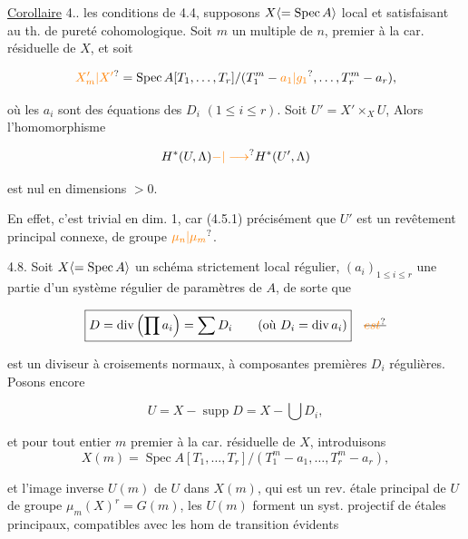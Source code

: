 
\uline{Corollaire} 4..  les conditions de 4.4, supposons $X\inserted{=\operatorname{Spec} A}$  local et satisfaisant au th. de pureté cohomologique. Soit $m$ un  multiple de $n$, premier à la car. résiduelle de $X$, et soit

\[
\unsure{X'_m|X'}=\operatorname{Spec} A[T_1,\ldots,T_r]/(T_1^m-\unsure{a_1|g_1},\ldots,T_r^m-a_r),
\]

où  les $a_i$ sont des équations  des $D_i$ $(1\leq i\leq r)$. Soit $U'=X'\times_X U$, Alors l'homomorphisme 

\[
H^*(U,\Lambda)\unsure{{-}|\longrightarrow}H^*(U',\Lambda)
\]

est nul en dimensions $>0$.

En effet, c'est trivial en dim. 1, car (4.5.1)  précisément   que $U'$ est un revêtement  principal connexe, de groupe $\unsure{\mu_n|\mu_m}$.


4.8. Soit $X\inserted{=\operatorname{Spec} A}$ un schéma strictement local régulier, $(a_i)_{1\leq i\leq r}$ une partie d'un système régulier de paramètres de $A$, de sorte que  

\[
\boxed{D=\operatorname{div}\left(\prod a_i\right)=\sum D_i\qquad (\text{où }D_i=\operatorname{div}a_i)}\quad\deleted{\unsure{est}}
\]

est un diviseur à croisements normaux, à composantes premières $D_i$ régulières. Posons encore

\[
\boxed{U=X-\operatorname{supp}D=X-\bigcup D_i},
\]

 et pour tout entier $m$ premier à la car. résiduelle de $X$, introduisons
\[
X(m)=\operatorname{Spec}A[T_1,\ldots,T_r]/(T_1^m-a_1,\ldots,T_r^m-a_r),
\]


et l'image inverse $U(m)$ de $U$ dans $X(m)$, qui est un rev. étale  principal de $U$ de groupe $\mu_m(X)^r=G(m)$, les $U(m)$ forment un syst. projectif de   étales  principaux, compatibles avec les hom de transition évidents

